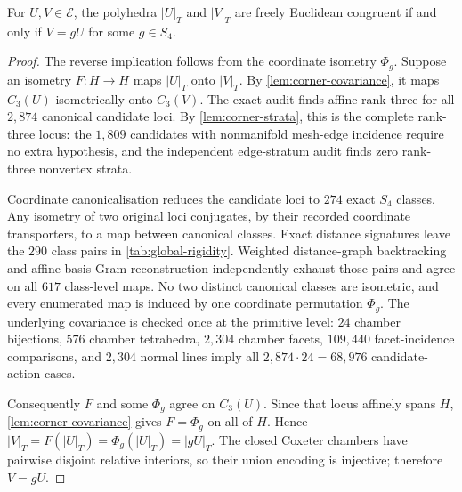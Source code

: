\begin{theorem}
\label{thm:global-rigidity}
For $U,V\in\mathcal E$, the polyhedra $|U|_T$ and $|V|_T$ are freely
Euclidean congruent if and only if $V=gU$ for some $g\in S_4$.
\end{theorem}
\begin{proof}
The reverse implication follows from the coordinate isometry $\Phi_g$.
Suppose an isometry $F:H\to H$ maps $|U|_T$ onto $|V|_T$.  By
\cref{lem:corner-covariance}, it maps $C_3(U)$ isometrically onto $C_3(V)$.
The exact audit finds affine rank three for all $2{,}874$ canonical candidate
loci.  By \cref{lem:corner-strata}, this is the complete rank-three locus:
the $1{,}809$ candidates with nonmanifold mesh-edge incidence require no
extra hypothesis, and the independent edge-stratum audit finds zero
rank-three nonvertex strata.

Coordinate canonicalisation reduces the candidate loci to $274$ exact
$S_4$ classes.  Any isometry of two original loci conjugates, by their
recorded coordinate transporters, to a map between canonical classes.
Exact distance signatures leave the $290$ class pairs in
\cref{tab:global-rigidity}.  Weighted distance-graph backtracking and
affine-basis Gram reconstruction independently exhaust those pairs and agree
on all $617$ class-level maps.  No two distinct canonical classes are
isometric, and every enumerated map is induced by one coordinate permutation
$\Phi_g$.  The underlying covariance is checked once at the primitive level:
$24$ chamber bijections, $576$ chamber tetrahedra, $2{,}304$ chamber facets,
$109{,}440$ facet-incidence comparisons, and $2{,}304$ normal lines imply all
$2{,}874\cdot24=68{,}976$ candidate-action cases.

Consequently $F$ and some $\Phi_g$ agree on $C_3(U)$.  Since that locus
affinely spans $H$, \cref{lem:corner-covariance} gives $F=\Phi_g$ on all of
$H$.  Hence $|V|_T=F(|U|_T)=\Phi_g(|U|_T)=|gU|_T$.  The closed Coxeter
chambers have pairwise disjoint relative interiors, so their union encoding
is injective; therefore $V=gU$.
\end{proof}


